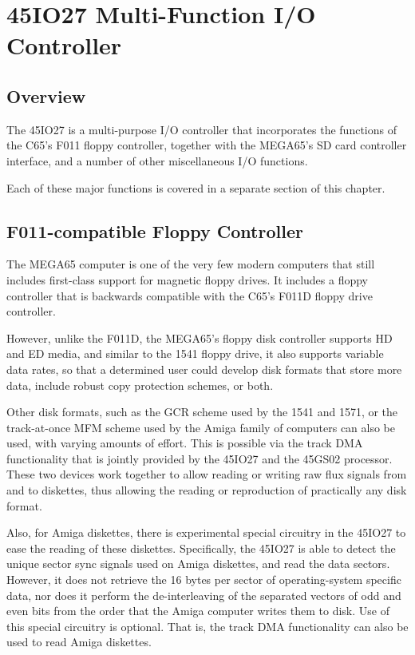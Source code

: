 \chapter{45IO27 Multi-Function I/O Controller}

\section{Overview}

The 45IO27 is a multi-purpose I/O controller that incorporates the functions of the
C65's F011 floppy controller, together with the MEGA65's SD card controller interface,
and a number of other miscellaneous I/O functions.

Each of these major functions is covered in a separate section of this chapter.

\section{F011-compatible Floppy Controller}

The MEGA65 computer is one of the very few modern computers that still
includes first-class support for magnetic floppy drives.  It includes
a floppy controller that is backwards compatible with the C65's F011D
floppy drive controller.

However, unlike the F011D, the MEGA65's
floppy disk controller supports HD and ED media, and similar to the
1541 floppy drive, it also supports variable data rates, so that a
determined user could develop disk formats that store more data,
include robust copy protection schemes, or both.

Other disk formats, such as the GCR scheme used by the 1541 and 1571,
or the track-at-once MFM scheme used by the Amiga\texttrademark{} family of computers
can also be used, with varying amounts of effort. This is possible via
the track DMA functionality that is jointly provided by the 45IO27 and
the 45GS02 processor. These two devices work together to allow reading
or writing raw flux signals from and to diskettes, thus allowing the
reading or reproduction of practically any disk format.

Also, for
Amiga\texttrademark{} diskettes, there is experimental special circuitry in the 45IO27
to ease the
reading of these diskettes. Specifically, the 45IO27 is able to detect
the unique sector sync signals used on Amiga\texttrademark{} diskettes, and read the
data sectors. However, it does not retrieve the 16 bytes per sector of
operating-system specific data, nor does it perform the de-interleaving
of the separated vectors of odd and even bits from the order that the Amiga\texttrademark{}
computer writes them to disk.  Use of this special circuitry is optional.
That is, the track DMA functionality can also be used to read Amiga\texttrademark{}
diskettes.


